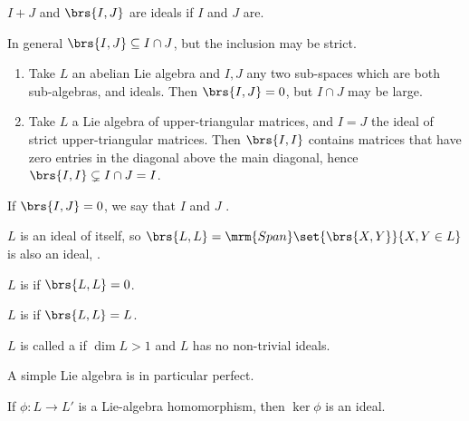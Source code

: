 \documentclass[10pt,a4paper,twoside,openany,hidelinks]{book}
\begin{document}
\begin{conclusion}
$I+J$ and $\brs{I,J}$ are ideals if $I$ and $J$ are.
\end{conclusion}
\begin{remark}
In general $\brs{I,J} \subseteq I \cap J$, but the inclusion may be strict.
\begin{examples}
\begin{enumerate}
\item Take $L$ an abelian Lie algebra and $I,J$ any two sub-spaces which are both sub-algebras, and ideals. Then $\brs{I,J} = 0$, but $I \cap J$ may be large.
\item Take $L$ a Lie algebra of upper-triangular matrices, and $I=J$ the ideal of strict upper-triangular matrices. Then $\brs{I,I}$ contains matrices that have zero entries in the diagonal above the main diagonal, hence $\brs{I,I} \subsetneq I\cap J = I$.
\end{enumerate}
\end{examples}
\end{remark}
\begin{definition}
If $\brs{I,J} = 0$, we say that $I$ and $J$ .
\end{definition}
\begin{remark}
$L$ is an ideal of itself, so $\brs{L,L} = \mrm{Span}\set{\brs{X,Y}}{X,Y \in L}$ is also an ideal, .
\end{remark}
\begin{definition}
$L$ is  if $\brs{L,L} = 0$.
\end{definition}
\begin{definition}
$L$ is  if $\brs{L,L} = L$.
\end{definition}
\begin{definition}
$L$ is called a  if $\dim L > 1$ and $L$ has no non-trivial ideals.
\end{definition}
\begin{exercise}
A simple Lie algebra is in particular perfect.
\end{exercise}
\begin{proposition}
If $\phi \colon L \to L'$ is a Lie-algebra homomorphism, then $\ker \phi$ is an ideal.
\end{proposition}
\end{document}
